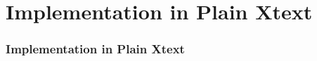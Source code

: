\section{Implementation in Plain Xtext}

\begin{frame}
\frametitle{Implementation in Plain Xtext}

\end{frame}